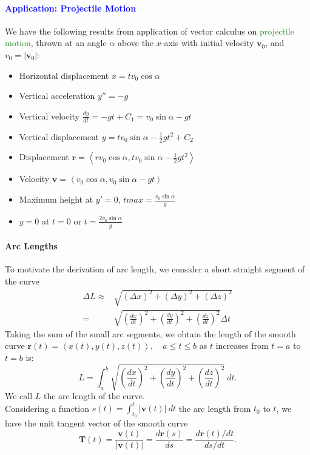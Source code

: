 \textcolor{Blue}{\paragraph{Application: Projectile Motion}}
We have the following results from application of vector calculus on
\textcolor{ForestGreen}{projectile motion}, thrown at an angle $\alpha$ above
the $x$-axis with initial velocity $\mathbf{v}_0$, and $v_0=\left| \mathbf{v}_0
\right| $:
\begin{itemize}
  \item Horizontal displacement $x=tv_0\cos{\alpha}$
  \item Vertical acceleration $y'' = -g$ 
  \item Vertical velocity $\frac{dy}{dt} = -gt + C_1=v_0\sin{\alpha}-gt$
  \item Vertical displacement $y=tv_0\sin{\alpha}-\frac{1}{2}gt^{2}+C_2$
  \item Displacement $\mathbf{r}=\left<rv_0\cos{\alpha},tv_0\sin{\alpha}-\frac{1}{2}gt^{2} \right> $
  \item Velocity $\mathbf{v}=\left<v_0\cos{\alpha},v_0\sin{\alpha}-gt\right> $
  \item Maximum height at $y'=0$, $tmax=\frac{v_0\sin{\alpha}}{g}$
  \item $y=0$ at $t=0$ or $t=\frac{2v_0\sin{\alpha}}{g}$
\end{itemize}

\paragraph{Arc Lengths}
To motivate the derivation of arc length, we consider a short straight segment
of the curve 
\begin{align*}
  \Delta L\approx&\sqrt{{\left( \Delta x \right) }^{2}+{\left(
\Delta y \right) }^{2}+{\left( \Delta z \right) }^{2}}\\
        =&\sqrt{{\left( \frac{dx}{dt} \right) }^{2}+{\left( \frac{dy}{dt} \right) }^{2}+{\left( \frac{dz}{dt} \right) }^{2}}\Delta t
\end{align*}
Taking the sum of the small arc segments, we obtain the length of the smooth
curve
$\mathbf{r}\left( t \right) =\left< x\left( t \right) ,y(t),z(t) \right>,\quad
a\le t\le b$ as $t$ increases from $t=a$ to $t=b$ is:
\[L=\int_{{a}}^{{b}} {\sqrt{{\left( \frac{dx}{dt} \right) }^{2} +{\left( \frac{dy}{dt} \right) }^{2}+{\left( \frac{dz}{dt} \right) }^{2}}} \: d{t} {}.\]
We call $L$ the \textcolor{Bittersweet}{arc length} of the curve.\\
Considering a function $s(t)=\int_{{t_0}}^{{t}} {\left| \mathbf{v}\left( t
\right)  \right| } \: d{t} {}$ the arc length from $t_0$ to $t$, we have the \textcolor{Bittersweet}{unit
tangent vector} of the smooth curve
\[\mathbf{T}\left( t \right)=\frac{\mathbf{v}(t)}{\left| \mathbf{v}(t) \right| }=\frac{d\mathbf{r}(s)}{ds}=\frac{d\mathbf{r}(t)/dt}{ds/dt}.\] 

